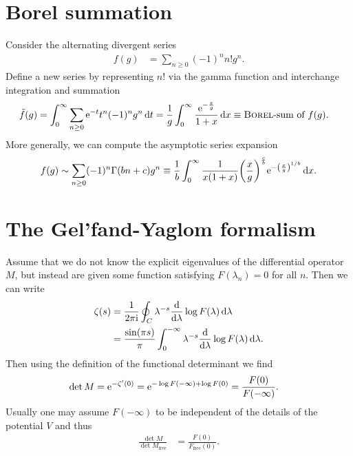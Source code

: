 \documentclass[english, parskip=full]{scrartcl}
\begin{document}
\section{Borel summation}
Consider the alternating divergent series
\begin{align}
f(g) &= \sum_{n\ge 0} (-1)^n n! g^n.
\end{align}
Define a new series by representing $n!$ via the gamma function and interchange integration and summation
\begin{align}
\tilde{f}(g) &= \int_{0}^{\infty}  \sum_{n\ge 0} \text{e}^{-t} t^n (-1)^n g^n  \,\mathrm{d}t = \frac{1}{g} \int_{0}^{\infty} \frac{\text{e}^{-\frac{x}{g}}}{1 + x} \,\mathrm{d}x \equiv \textsc{Borel}\text{-sum of }f(g).
\end{align}
More generally, we can compute the asymptotic series expansion
\begin{align}
f(g) \sim \sum_{n\ge 0} (-1)^n \Gamma\kla*{b n + c} g^n \equiv \frac{1}{b} \intx{0}{\infty}{ \frac{1}{x(1+x)} \kla*{\frac{x}{g}}^\frac{c}{b} \powe{-\kla*{\frac{x}{g}}^{1/b}} }{x}.
\end{align}
\section{The Gel'fand-Yaglom formalism}
Assume that we do not know the explicit eigenvalues of the differential operator $M$, but instead are given some function satisfying $F(\lambda_n) = 0$ for all $n$.
Then we can write
\begin{align}
\zeta(s) &= \frac{1}{2\pi\text{i}} \oint_C \lambda^{-s} \frac{\text{d}}{\text{d}\lambda} \log F(\lambda) \,\text{d}\lambda\\
&= \frac{\sin(\pi s)}{\pi} \int_{0}^{-\infty} \lambda^{-s}\frac{\text{d}}{\text{d}\lambda} \log F(\lambda)  \,\mathrm{d}\lambda.
\end{align}
Then using the definition of the functional determinant we find
\begin{align}
\det M &= \text{e}^{-\zeta'(0)} = \text{e}^{-\log F(-\infty) + \log F(0)} = \frac{F(0)}{F(-\infty)}.
\end{align}
Usually one may assume $F(-\infty)$ to be independent of the details of the potential $V$ and thus
\begin{align}
\frac{\det M}{\det M_\text{free}} &= \frac{F(0)}{F_\text{free}(0)}.
\end{align}
\end{document}
